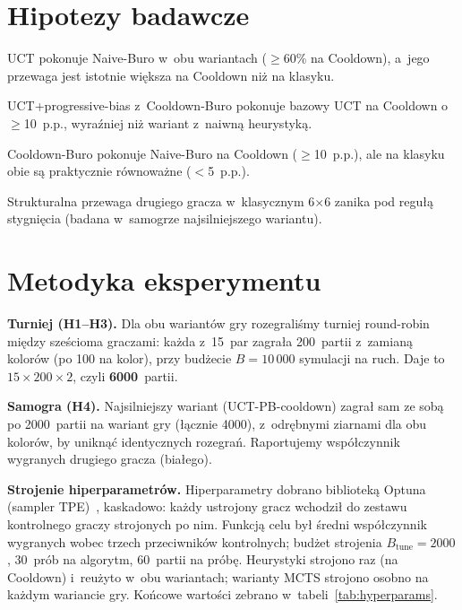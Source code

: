 \documentclass[12pt,a4paper]{article}
\begin{document}
\section{Hipotezy badawcze}\label{sec:hipotezy}
\begin{description}[leftmargin=2.4em,itemsep=3pt]
  \item[H1] UCT pokonuje Naive-Buro w~obu wariantach ($\geq$60\% na Cooldown), a~jego przewaga
    jest istotnie większa na Cooldown niż na klasyku.
  \item[H2] UCT+progressive-bias z~Cooldown-Buro pokonuje bazowy UCT na Cooldown o~$\geq$10~p.p.,
    wyraźniej niż wariant z~naiwną heurystyką.
  \item[H3] Cooldown-Buro pokonuje Naive-Buro na Cooldown ($\geq$10~p.p.), ale na klasyku obie są
    praktycznie równoważne ($<$5~p.p.).
  \item[H4] Strukturalna przewaga drugiego gracza w~klasycznym 6$\times$6 zanika pod regułą
    stygnięcia (badana w~samogrze najsilniejszego wariantu).
\end{description}

\section{Metodyka eksperymentu}\label{sec:metodyka}

\textbf{Turniej (H1--H3).} Dla obu wariantów gry rozegraliśmy turniej round-robin między sześcioma
graczami: każda z~15~par zagrała 200~partii z~zamianą kolorów (po 100 na kolor), przy budżecie
$B=10\,000$ symulacji na ruch. Daje to $15\times200\times2$, czyli \textbf{6000}~partii.

\textbf{Samogra (H4).} Najsilniejszy wariant (UCT-PB-cooldown) zagrał sam ze sobą po 2000~partii na
wariant gry (łącznie 4000), z~odrębnymi ziarnami dla obu kolorów, by uniknąć identycznych
rozegrań. Raportujemy współczynnik wygranych drugiego gracza (białego).

\textbf{Strojenie hiperparametrów.} Hiperparametry dobrano biblioteką Optuna (sampler
TPE)~\cite{akiba2019optuna}, kaskadowo: każdy ustrojony gracz wchodził do zestawu kontrolnego
graczy strojonych po nim. Funkcją celu był średni współczynnik wygranych wobec trzech przeciwników
kontrolnych; budżet strojenia $B_{\mathrm{tune}}=2000$, 30~prób na algorytm, 60~partii na próbę.
Heurystyki strojono raz (na Cooldown) i~reużyto w~obu wariantach; warianty MCTS strojono osobno na
każdym wariancie gry. Końcowe wartości zebrano w~tabeli~\ref{tab:hyperparams}.
\end{document}
